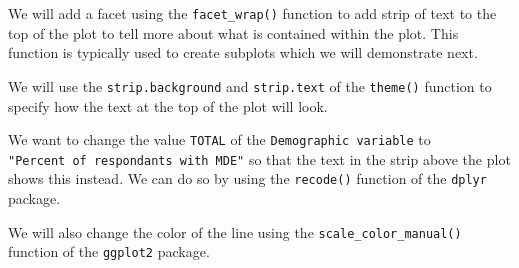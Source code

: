 \documentclass[
]{article}
\begin{document}
We will add a facet using the \texttt{facet\_wrap()} function to add
strip of text to the top of the plot to tell more about what is
contained within the plot. This function is typically used to create
subplots which we will demonstrate next.

We will use the \texttt{strip.background} and \texttt{strip.text} of the
\texttt{theme()} function to specify how the text at the top of the plot
will look.

We want to change the value \texttt{TOTAL} of the
\texttt{Demographic\ variable} to
\texttt{"Percent\ of\ respondants\ with\ MDE"} so that the text in the
strip above the plot shows this instead. We can do so by using the
\texttt{recode()} function of the \texttt{dplyr} package.

We will also change the color of the line using the
\texttt{scale\_color\_manual()} function of the \texttt{ggplot2}
package.
\end{document}
